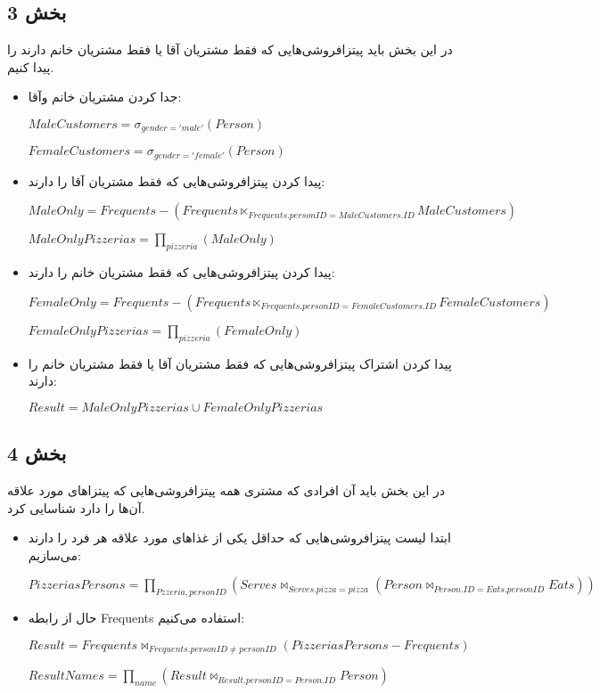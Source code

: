 \subsection*{بخش 3}
در این بخش باید پیتزافروشی‌هایی که فقط مشتریان آقا یا فقط مشتریان خانم دارند را پیدا کنیم.
\begin{itemize}	
	\item جدا کردن مشتریان خانم وآقا:
	
	\setLTR
	$MaleCustomers = \sigma_{gender = 'male'} (Person)$
	
	$FemaleCustomers = \sigma_{gender = 'female'} (Person)$
	\setRTL
	
	\item پیدا کردن پیتزافروشی‌هایی که فقط مشتریان آقا را دارند:
	
		\setLTR
$MaleOnly = Frequents - (Frequents \ltimes_{Frequents.personID=MaleCustomers.ID} MaleCustomers)$

$MaleOnlyPizzerias = \prod_{pizzeria} (MaleOnly)$
	\setRTL
	
		\item پیدا کردن پیتزافروشی‌هایی که فقط مشتریان خانم را دارند:
	
	\setLTR
	$FemaleOnly = Frequents - (Frequents \ltimes_{Frequents.personID=FemaleCustomers.ID} FemaleCustomers)$
	
	$FemaleOnlyPizzerias = \prod_{pizzeria} (FemaleOnly)$
	\setRTL
	
	\item پیدا کردن اشتراک پیتزافروشی‌هایی که فقط مشتریان آقا یا فقط مشتریان خانم را دارند:
	
		\setLTR
	$Result = MaleOnlyPizzerias \cup FemaleOnlyPizzerias$
	\setRTL
	
	
\end{itemize}

\subsection*{بخش 4}
در این بخش باید آن افرادی که مشتری همه پیتزافروشی‌هایی که پیتزاهای مورد علاقه آن‌ها را دارد شناسایی کرد.
\begin{itemize}	
		\item
		ابتدا لیست پیتزافروشی‌هایی که حداقل یکی از غذاهای مورد علاقه هر فرد را دارند می‌سازیم:
		
	
	\setLTR
	$PizzeriasPersons =\prod_{Pzzeria,personID} (Serves \bowtie_{Serves.pizza = pizza}({Person \bowtie_{Person.ID=Eats.personID}Eats}))$
	\setRTL
	
	\item 
	حال از رابطه Frequents استفاده می‌کنیم:
	
	\setLTR
	$Result =Frequents \bowtie_{Frequents.personID \neq  personID}(PizzeriasPersons - Frequents)$
	
	$ResultNames =  \prod_{name}(Result \bowtie_{Result.personID=Person.ID}Person)$
	\setRTL
\end{itemize}

